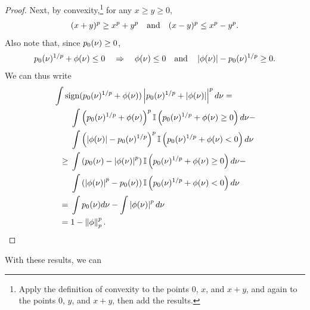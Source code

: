 \begin{lem}
\begin{proof}
Next, by convexity,\footnote{Apply the definition of convexity to the points
$0$, $x$, and $x + y$, and again to the points $0$, $y$, and $x+y$, then add the
results.} for any $x \ge y \ge 0$,
%
\begin{align*}
%
(x + y)^p \ge{} x^p + y^p \mathand
(x - y)^p \le{} x^p - y^p.
%
\end{align*}
%
Also note that, since $p_{0}(\nu) \ge 0$,
%
\begin{align*}
%
\pbase(\nu)^{1/p} + \phi(\nu) \le 0
\quad\Rightarrow\quad
\phi(\nu) \le 0 \mathand
\abs{\phi(\nu)} - \pbase(\nu)^{1/p} \ge 0.
%
\end{align*}
%
We can thus write
%
\begin{align*}
%
\MoveEqLeft
\int \mathrm{sign}(\pbase(\nu)^{1/p} + \phi(\nu))
    \abs{\pbase(\nu)^{1/p} + \abs{\phi(\nu)}}^{p} d\nu
={}\\&
    \int \left(\pbase(\nu)^{1/p} + \phi(\nu)\right)^{p}
        \ind{\pbase(\nu)^{1/p} + \phi(\nu) \ge 0}
        d\nu - \\&
    \int \left(\abs{\phi(\nu)} - \pbase(\nu)^{1/p}\right)^{p}
        \ind{\pbase(\nu)^{1/p} + \phi(\nu) < 0}
        d\nu
\\\ge{}&
    \int \left(\pbase(\nu) - \abs{\phi(\nu)}^{p}\right)
        \ind{\pbase(\nu)^{1/p} + \phi(\nu) \ge 0}
        d\nu - \\&
    \int \left(\abs{\phi(\nu)}^p - \pbase(\nu)\right)
        \ind{\pbase(\nu)^{1/p} + \phi(\nu) < 0}
        d\nu
\\={}&
    \int \pbase(\nu) d\nu - \int \abs{\phi(\nu)}^p d\nu
\\={}&
    1 - \norm{\phi}_p^p.
%
\end{align*}
%
\end{proof}
%
\end{lem}



With these results, we can
